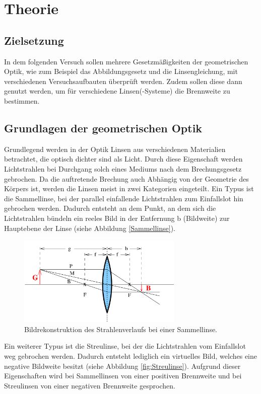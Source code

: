 \section{Theorie}

\subsection{Zielsetzung}

In dem folgenden Versuch sollen mehrere Gesetzmäßigkeiten der geometrischen Optik,
wie zum Beispiel das Abbildungsgesetz und die Linsengleichung, mit verschiedenen
Versuchsaufbauten überprüft werden. Zudem sollen diese dann genutzt werden, um
für verschiedene Linsen(-Systeme) die Brennweite zu bestimmen.

\subsection{Grundlagen der geometrischen Optik}

Grundlegend werden in der Optik Linsen aus verschiedenen Materialien betrachtet,
die optisch dichter sind als Licht. Durch diese Eigenschaft werden Lichtstrahlen
bei Durchgang solch eines Mediums nach dem Brechungsgesetz gebrochen. Da die
auftretende Brechung auch Abhängig von der Geometrie des Körpers ist, werden
die Linsen meist in zwei Kategorien eingeteilt. Ein Typus ist die Sammellinse, bei
der parallel einfallende Lichtstrahlen zum Einfallslot hin gebrochen werden.
Dadurch entsteht an dem Punkt, an dem sich die Lichtstrahlen bündeln ein reeles
Bild in der Entfernung b (Bildweite) zur Hauptebene der Linse (siehe Abbildung
\ref{Sammellinse}).

\begin{figure}
  \centering
  \includegraphics[width = 0.7\textwidth]{Pics/Sammellinse.png}
  \caption{Bildrekonstruktion des Strahlenverlaufs bei einer Sammellinse.\cite{anleitung01}}
  \label{fig:Sammellinse}
\end{figure}

Ein weiterer Typus ist die Streulinse, bei der die Lichtstrahlen vom Einfallslot
weg gebrochen werden. Dadurch entsteht lediglich ein virtuelles Bild, welches
eine negative Bildweite besitzt (siehe Abbildung \ref{fig:Streulinse}). Aufgrund dieser
Eigenschaften wird bei Sammellinsen von einer positiven Brennweite und bei
Streulinsen von einer negativen Brennweite gesprochen.

